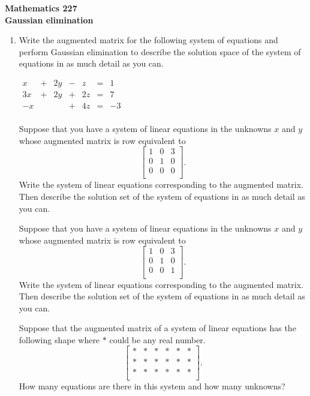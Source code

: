 \documentclass[12pt]{article}
\newcommand{\ds}{\displaystyle}
\newcommand{\vs}[1]{\vspace{#1in}}
\begin{document}
\noindent
{\bf Mathematics 227} \\ 
{\bf Gaussian elimination}

\bigskip
\begin{enumerate}
\item Write the augmented matrix for the following system of equations
  and perform Gaussian elimination to describe the solution space
  of the system of equations in as much detail as you can.


  $\ds
  \begin{alignedat}{4}
    x &  {}+{}  & 2y &  {}-{}  & z &  {}={}  & 1 \\
    3x &  {}+{}  & 2y &  {}+{}  & 2z &  {}={}  & 7 \\
    -x &  &  &  {}+{}  & 4z &  {}={}  & -3 \\
  \end{alignedat}
  $
  
  \vs{3}
  Suppose that you have a system of linear equations in the
  unknowns $x$ and $y$ whose
  augmented matrix is row equivalent to 
  $$
  \left[
    \begin{array}{rr|r}
      1 & 0 & 3 \\ 
      0 & 1 & 0 \\ 
      0 & 0 & 0 \\
    \end{array}
  \right].
  $$
  Write the system of linear equations corresponding to the
  augmented matrix.  Then describe the solution set of the
  system of equations in as much detail as you can.

  \vs{1.5}
  \newpage
  Suppose that you have a system of linear equations in the
  unknowns $x$ and $y$
  whose
  augmented matrix is row equivalent to 
  $$
  \left[
    \begin{array}{rr|r}
      1 & 0 & 3 \\ 
      0 & 1 & 0 \\ 
      0 & 0 & 1 \\
    \end{array}
  \right].
  $$
  Write the system of linear equations corresponding to the
  augmented matrix.  Then describe the solution set of the
  system of equations in as much detail as you can.

  \vs{1}
   Suppose that the augmented matrix of a system of linear
   equations has the following shape where $*$ could be
   any real number.
   $$
   \left[
     \begin{array}{rrrrr|r}
       * & * & * & * & * & * \\ 
       * & * & * & * & * & * \\ 
       * & * & * & * & * & * \\ 
     \end{array}
   \right].
   $$
   How many equations are there in this system and how many
   unknowns?


\end{enumerate}
\end{document}
